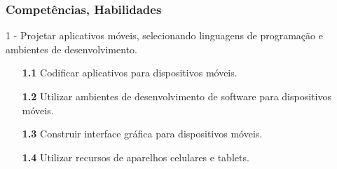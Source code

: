 \begin{frame}
	\frametitle{Competências, Habilidades}
	
	\par 1 - Projetar aplicativos móveis, selecionando linguagens de programação e ambientes de desenvolvimento.
	
	\begin{itemize}
		\item[\textbf{1.1}] Codificar aplicativos para dispositivos móveis.
		\item[\textbf{1.2}] Utilizar ambientes de desenvolvimento de software para dispositivos móveis.
		\item[\textbf{1.3}] Construir interface gráfica para dispositivos móveis.
		\item[\textbf{1.4}] Utilizar recursos de aparelhos celulares e tablets.
	\end{itemize}
\end{frame}
